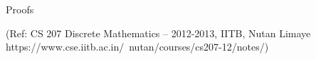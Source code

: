 
\begin{frame}[fragile]\frametitle{}
\begin{center}
{\Large Proofs}

\tiny{(Ref: CS 207 Discrete Mathematics – 2012-2013, IITB, 
Nutan Limaye
 https://www.cse.iitb.ac.in/~nutan/courses/cs207-12/notes/)}
\end{center}
\end{frame}



\newtheorem{axiom}{Axiom}[theorem]
\newtheorem{conj}{Conjecture}[theorem]


\newcommand{\TealBlue}[1]{\textcolor{TealBlue}{#1}}
\newcommand{\Peach}[1]{\textcolor{Peach}{#1}}
\newcommand{\Cyan}[1]{\textcolor{cyan}{#1}}
\newcommand{\Red}[1]{\textcolor{red}{#1}}
\newcommand{\BrickRed}[1]{\textcolor{BrickRed}{#1}}
\newcommand{\Blue}[1]{\textcolor{blue}{#1}}
\newcommand{\Green}[1]{\textcolor{green}{#1}}
\newcommand{\Black}[1]{\textcolor{black}{#1}}
\newcommand{\White}[1]{\textcolor{white}{#1}}
\newcommand{\Blueit}[1]{\textcolor{Blue}{\emph{#1}}}
\newcommand{\Magentait}[1]{\textcolor{Magenta}{\emph{#1}}}
\newcommand{\Orangeit}[1]{\textcolor{Orange}{\emph{#1}}}
\newcommand{\Greenit}[1]{\textcolor{Green}{\emph{#1}}}
\newcommand{\Cyanit}[1]{\textcolor{cyan}{\emph{#1}}}


%
%

\newcommand{\RingNat}{{{\mathbb{N}}}}
\newcommand{\RingInt}{{{\mathbb{Z}}}}
\newcommand{\RingReal}{{{\mathbb{R}}}}
\newcommand{\RingRat}{{{\mathbb{Q}}}}
\newcommand{\RingPosInt}{{{\mathbb{Z^+}}}}
\newcommand{\myand}{\wedge}
\newcommand{\myor}{\vee}
\newcommand{\mynot}{\neg}


